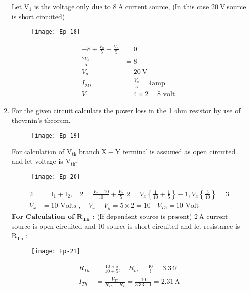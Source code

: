 \begin{enumerate}
\begin{answer}
		Let $\mathrm{V}_{1}$ is the voltage only due to $8 \mathrm{~A}$ current source, (In this case $20 \mathrm{~V}$ source is short circuited)
		\begin{figure}[H]
			\centering
			\texttt{[image: Ep-18]}
		\end{figure}
		\begin{align*}
		-8+\frac{V_{a}}{5}+\frac{V_{a}}{5} &=0 \\
		\frac{2 V_{a}}{5} &=8 \\
		V_{a} &=20 \mathrm{~V} \\
		I_{2 \Omega} &=\frac{V_{a}}{5}=4 \mathrm{amp} \\
		V_{1} &=4 \times 2=8 \text { volt }
		\end{align*}
	\end{answer}
	\item For the given circuit calculate the power loss in the 1 ohm resistor by use of thevenin's theorem.
	\begin{figure}[H]
		\centering
		\texttt{[image: Ep-19]}
	\end{figure}
	\begin{answer}
		For calculation of $\mathrm{V}_{\mathrm{th}}$ branch $\mathrm{X}-\mathrm{Y}$ terminal is assumed as open circuited and let voltage is $\mathrm{V}_{\mathrm{th^-}}$ 
		\begin{figure}[H]
			\centering
			\texttt{[image: Ep-20]}
		\end{figure}
		\begin{align*}
		2&=\mathrm{I}_{1}+\mathrm{I}_{2}, \quad 2=\frac{V_{x}-10}{10}+\frac{V_{x}}{5}, 2=V_{x}\left\{\frac{1}{10}+\frac{1}{5}\right\}-1, V_{x}\left\{\frac{3}{10}\right\}=3 \\
		V_{x}&=10 \text { Volts }, \quad V_{x}-V_{y}=5 \times 2=10 \quad V_{T h}=10 \text { Volt }
		\end{align*}
		\textbf{For Calculation of $\mathbf{R}_{\mathbf{Th}}$ : }(If dependent source is present) $2 \mathrm{~A}$ current source is open circuited and 10 source is short circuited and let resistance is $\mathrm{R}_{\mathrm{Th}}$ :
		\begin{figure}[H]
			\centering
			\texttt{[image: Ep-21]}
		\end{figure}
		\begin{align*}
		R_{T h}&=\frac{10 \times 5}{10+5}, \quad R_{m}=\frac{10}{3}=3.3 \Omega\\
		I_{T h}&=\frac{V_{T h}}{R_{T h}+R_{L}}=\frac{10}{3.33+\mathrm{I}}=2.31 \mathrm{~A}

\end{align*}
\end{answer}
\end{enumerate}
